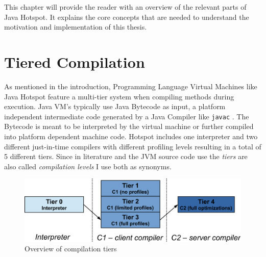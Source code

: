 This chapter will provide the reader with an overview of the relevant parts of Java Hotspot. It explains the core concepts that are needed to understand the motivation and implementation of this thesis.

\section{Tiered Compilation}
\label{sec:tiered}
As mentioned in the introduction, Programming Language Virtual Machines like Java Hotspot feature a multi-tier system when compiling methods during execution. 
Java VM's typically use Java Bytecode as input, a platform independent intermediate code generated by a Java Compiler like \texttt{javac} \cite{javac}.
The Bytecode is meant to be interpreted by the virtual machine or further compiled into platform dependent machine code.
Hotspot includes one interpreter and two different just-in-time compilers with different profiling levels resulting in a total of 5 different tiers. Since in literature and the JVM source code use the \textit{tiers} are also called \textit{compilation levels} I use both as synonyms. 
\begin{figure}[ht]
  \begin{center}
    \centering
    \includegraphics{figures/hs_tiers.png}
    \caption{Overview of compilation tiers}
    \label{f:hs_tiers}
  \end{center}
\end{figure}


